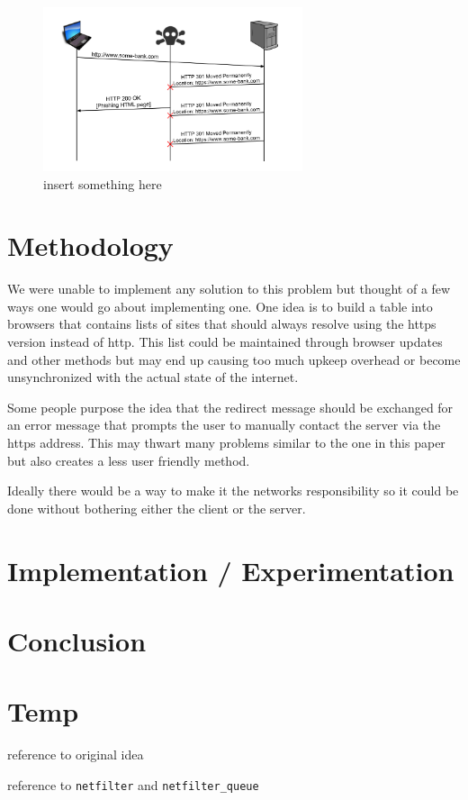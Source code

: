 \documentclass{article}
\begin{document}
\begin{figure}[t]
\begin{center}

\includegraphics[width=3in]{redirect_attack.png} 
\caption{insert something here} 
\label{fg:attack}

\end{center}
\end{figure}

\section{Methodology}
We were unable to implement any solution to this problem but thought of a few ways one would go about implementing one.
One idea is to build a table into browsers that contains lists of sites that should always resolve using the https version instead of http.  This list could be maintained through browser updates and other methods but may end up causing too much upkeep overhead or become unsynchronized with the actual state of the internet.

Some people purpose the idea that the redirect message should be exchanged for an error message that prompts the user to manually contact the server via the https address.  This may thwart many problems similar to the one in this paper but also creates a less user friendly method.

Ideally there would be a way to make it the networks responsibility so it could be done without bothering either the client or the server.  


\section{Implementation / Experimentation}

\section{Conclusion}

\section{Temp}

reference to original idea\cite{offpath}

reference to \texttt{netfilter}\cite{netfilter} and \texttt{netfilter\_queue}\cite{netfilterQueue}



\end{document}
